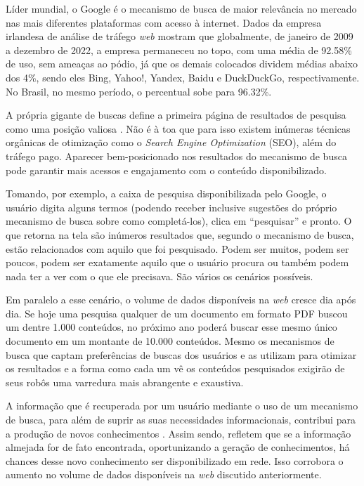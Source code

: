 \documentclass[portuguese]{textolivre}
\begin{document}
Líder mundial, o Google é o mecanismo de busca de maior relevância no mercado nas mais diferentes plataformas com acesso à internet. Dados da empresa irlandesa de análise de tráfego \textit{web} \textcite{statcounter_search_2022} mostram que globalmente, de janeiro de 2009 a dezembro de 2022, a empresa permaneceu no topo, com uma média de 92.58\% de uso, sem ameaças ao pódio, já que os demais colocados dividem médias abaixo dos 4\%, sendo eles Bing, Yahoo!, Yandex, Baidu e DuckDuckGo, respectivamente. No Brasil, no mesmo período, o percentual sobe para 96.32\%.
 
A própria gigante de buscas define a primeira página de resultados de pesquisa como uma posição valiosa \cite{google_exibir_2021}. Não é à toa que para isso existem inúmeras técnicas orgânicas de otimização como o \textit{Search Engine Optimization} (SEO), além do tráfego pago. Aparecer bem-posicionado nos resultados do mecanismo de busca pode garantir mais acessos e engajamento com o conteúdo disponibilizado.

Tomando, por exemplo, a caixa de pesquisa disponibilizada pelo Google, o usuário digita alguns termos (podendo receber inclusive sugestões do próprio mecanismo de busca sobre como completá-los), clica em “pesquisar” e pronto. O que retorna na tela são inúmeros resultados que, segundo o mecanismo de busca, estão relacionados com aquilo que foi pesquisado. Podem ser muitos, podem ser poucos, podem ser exatamente aquilo que o usuário procura ou também podem nada ter a ver com o que ele precisava. São vários os cenários possíveis.

Em paralelo a esse cenário, o volume de dados disponíveis na \textit{web} cresce dia após dia. Se hoje uma pesquisa qualquer de um documento em formato PDF buscou um dentre 1.000 conteúdos, no próximo ano poderá buscar esse mesmo único documento em um montante de 10.000 conteúdos. Mesmo os mecanismos de busca que captam preferências de buscas dos usuários e as utilizam para otimizar os resultados e a forma como cada um vê os conteúdos pesquisados exigirão de seus robôs uma varredura mais abrangente e exaustiva.

A informação que é recuperada por um usuário mediante o uso de um mecanismo de busca, para além de suprir as suas necessidades informacionais, contribui para a produção de novos conhecimentos \cite{choo_organizacao_2003}. Assim sendo, \textcite{santos_avaliacao_2015} refletem que se a informação almejada for de fato encontrada, oportunizando a geração de conhecimentos, há chances desse novo conhecimento ser disponibilizado em rede. Isso corrobora o aumento no volume de dados disponíveis na \textit{web} discutido anteriormente.
\end{document}

